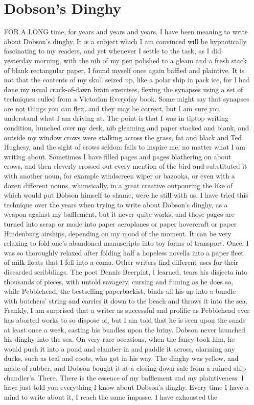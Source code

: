 \chapter{Dobson's Dinghy}

FOR A LONG time, for years and years and years, I have been meaning to write about Dobson's dinghy. It is a subject which I am convinced will be hypnotically fascinating to my readers, and yet whenever I settle to the task, as I did yesterday morning, with the nib of my pen polished to a gleam and a fresh stack of blank rectangular paper, I found myself once again baffled and plaintive. It is not that the contents of my skull seized up, like a polar ship in pack ice, for I had done my usual crack-of-dawn brain exercises, flexing the synapses using a set of techniques culled from a Victorian Everyday book. Some might say that synapses are not things you can flex, and they may be correct, but I am sure you understand what I am driving at. The point is that I was in tiptop writing condition, hunched over my desk, nib gleaming and paper stacked and blank, and outside my window crows were stalking across the grass, fat and black and Ted Hughesy, and the sight of crows seldom fails to inspire me, no matter what I am writing about. Sometimes I have filled pages and pages blathering on about crows, and then cleverly crossed out every mention of the bird and substituted it with another noun, for example windscreen wiper or bazooka, or even with a dozen different nouns, whimsically, in a great creative outpouring the like of which would put Dobson himself to shame, were he still with us. I have tried this technique over the years when trying to write about Dobson's dinghy, as a weapon against my bafflement, but it never quite works, and those pages are turned into scrap or made into paper aeroplanes or paper hovercraft or paper Hindenburg airships, depending on my mood of the moment. It can be very relaxing to fold one's abandoned manuscripts into toy forms of transport. Once, I was so thoroughly relaxed after folding half a hopeless novella into a paper fleet of milk floats that I fell into a coma. Other writers find different uses for their discarded scribblings. The poet Dennis Beerpint, I learned, tears his disjecta into thousands of pieces, with untold savagery, cursing and fuming as he does so, while Pebblehead, the bestselling paperbackist, binds all his up into a bundle with butchers' string and carries it down to the beach and throws it into the sea. Frankly, I am surprised that a writer as successful and prolific as Pebblehead ever has aborted works to so dispose of, but I am told that he is seen upon the sands at least once a week, casting his bundles upon the briny. Dobson never launched his dinghy into the sea. On very rare occasions, when the fancy took him, he would push it into a pond and clamber in and paddle it across, alarming any ducks, such as teal and coots, who got in his way. The dinghy was yellow, and made of rubber, and Dobson bought it at a closing-down sale from a ruined ship chandler's. There. There is the essence of my bafflement and my plaintiveness. I have just told you everything I know about Dobson's dinghy. Every time I have a mind to write about it, I reach the same impasse. I have exhausted the 